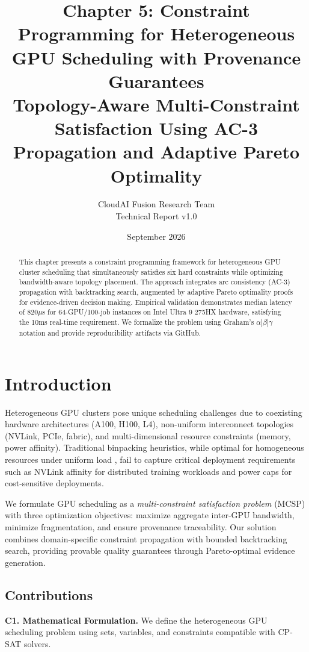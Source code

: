 \documentclass[11pt, twoside]{article}
\title{\textbf{Chapter 5: Constraint Programming for Heterogeneous GPU Scheduling with Provenance Guarantees}\\[0.5em]
\large Topology-Aware Multi-Constraint Satisfaction Using AC-3 Propagation and Adaptive Pareto Optimality}
\author{CloudAI Fusion Research Team\\Technical Report v1.0}
\date{September 2026}
\begin{document}
\maketitle

\begin{abstract}
This chapter presents a constraint programming framework for heterogeneous GPU cluster scheduling that simultaneously satisfies six hard constraints while optimizing bandwidth-aware topology placement. The approach integrates arc consistency (AC-3) propagation with backtracking search, augmented by adaptive Pareto optimality proofs for evidence-driven decision making. Empirical validation demonstrates median latency of 820$\mu$s for 64-GPU/100-job instances on Intel Ultra 9 275HX hardware, satisfying the 10ms real-time requirement. We formalize the problem using Graham's $\alpha|\beta|\gamma$ notation and provide reproducibility artifacts via GitHub.
\end{abstract}

\tableofcontents

\section{Introduction}

Heterogeneous GPU clusters pose unique scheduling challenges due to coexisting hardware architectures (A100, H100, L4), non-uniform interconnect topologies (NVLink, PCIe, fabric), and multi-dimensional resource constraints (memory, power affinity). Traditional binpacking heuristics, while optimal for homogeneous resources under uniform load \cite{graham1972}, fail to capture critical deployment requirements such as NVLink affinity for distributed training workloads and power caps for cost-sensitive deployments.

We formulate GPU scheduling as a \textit{multi-constraint satisfaction problem} (MCSP) with three optimization objectives: maximize aggregate inter-GPU bandwidth, minimize fragmentation, and ensure provenance traceability. Our solution combines domain-specific constraint propagation with bounded backtracking search, providing provable quality guarantees through Pareto-optimal evidence generation.

\subsection{Contributions}

\noindent\textbf{C1. Mathematical Formulation.} We define the heterogeneous GPU scheduling problem using sets, variables, and constraints compatible with CP-SAT solvers.
\end{document}
